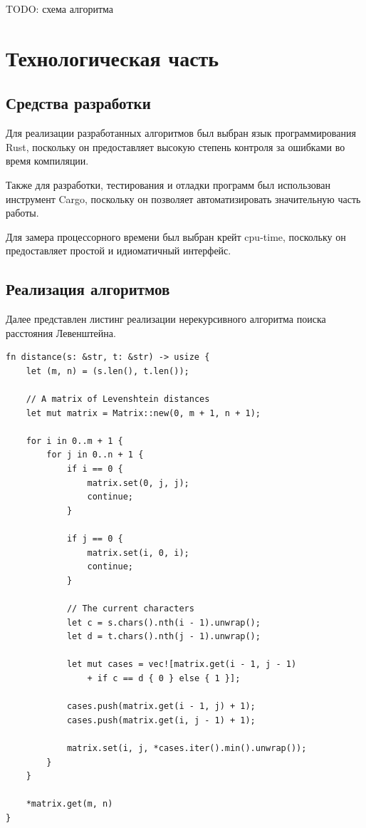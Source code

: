 \documentclass{report}
\begin{document}
TODO: схема алгоритма

\chapter{Технологическая часть}

\section{Средства разработки}

Для реализации разработанных алгоритмов был выбран язык
программирования Rust, поскольку он предоставляет высокую степень
контроля за ошибками во время компиляции.

Также для разработки, тестирования и отладки программ был
использован инструмент Cargo, поскольку он позволяет
автоматизировать значительную часть работы.

Для замера процессорного времени был выбран крейт cpu-time,
поскольку он предоставляет простой и идиоматичный интерфейс.

\section{Реализация алгоритмов}

Далее представлен листинг реализации нерекурсивного алгоритма
поиска расстояния Левенштейна.

\begin{lstlisting}[caption=
    Нерекурсивная реализация алгоритма поиска расстояния
    Левенштейна.
]
fn distance(s: &str, t: &str) -> usize {
    let (m, n) = (s.len(), t.len());

    // A matrix of Levenshtein distances
    let mut matrix = Matrix::new(0, m + 1, n + 1);

    for i in 0..m + 1 {
        for j in 0..n + 1 {
            if i == 0 {
                matrix.set(0, j, j);
                continue;
            }

            if j == 0 {
                matrix.set(i, 0, i);
                continue;
            }

            // The current characters
            let c = s.chars().nth(i - 1).unwrap();
            let d = t.chars().nth(j - 1).unwrap();

            let mut cases = vec![matrix.get(i - 1, j - 1)
                + if c == d { 0 } else { 1 }];

            cases.push(matrix.get(i - 1, j) + 1);
            cases.push(matrix.get(i, j - 1) + 1);

            matrix.set(i, j, *cases.iter().min().unwrap());
        }
    }

    *matrix.get(m, n)
}
\end{lstlisting}
\end{document}
